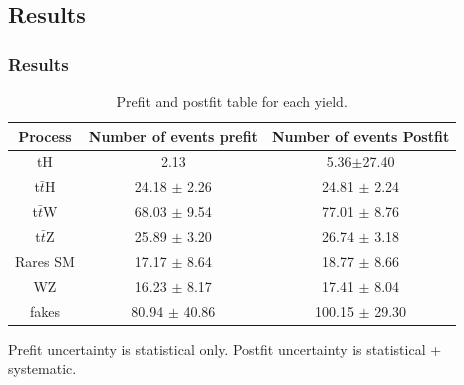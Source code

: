 \documentclass[11pt]{beamer}
\begin{document}
\begin{frame}
\section{Results}
\frametitle{Results}
\begin{table}
	\caption{Prefit and postfit table for each yield.}
\begin{tabular}{|c|c|c|}
	\hline
	Process  & Number of events prefit    & Number of events Postfit \\
	\hline
	tH & 2.13   & 5.36$\pm$27.40\\
	\hline
	t$\bar{t}$H  &  24.18 $\pm$ 2.26 & 24.81 $\pm$ 2.24 \\
	\hline
	t$\bar{t}$W  &  68.03 $\pm$ 9.54 & 77.01 $\pm$ 8.76\\
	\hline
	t$\bar{t}$Z  & 25.89 $\pm$ 3.20 & 26.74 $\pm$ 3.18\\
	\hline
	Rares SM & 17.17 $\pm$ 8.64 & 18.77 $\pm$ 8.66\\
	\hline
	WZ & 16.23 $\pm$ 8.17 & 17.41 $\pm$ 8.04\\
	\hline
	fakes  & 80.94 $\pm$ 40.86  & 100.15 $\pm$ 29.30\\
	\hline
\end{tabular}	
\end{table}
 Prefit uncertainty is statistical only. Postfit uncertainty is statistical + systematic.
\end{frame}
\end{document}
